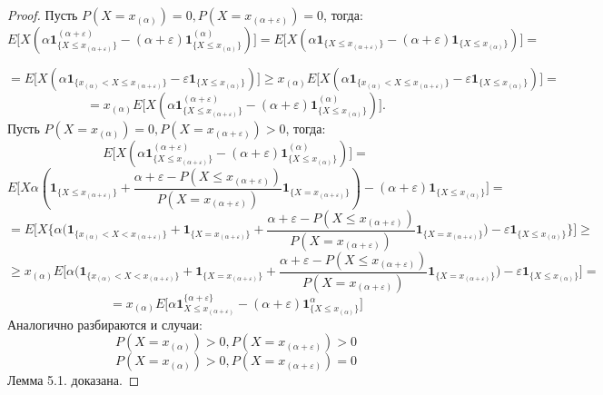 \documentclass[18pt,a4paper]{article}
\theoremstyle{plain}
\theoremstyle{definition}
\begin{document}
\begin{proof}
Пусть $P(X=x_{(\alpha)})=0,P(X=x_{(\alpha + \varepsilon)})=0 $, тогда:\\
$$
E\Big[X(\alpha\mathbf{1}^{(\alpha + \varepsilon)}_{\{X \le x_{(\alpha + \varepsilon)}  \} } - (\alpha + \varepsilon)\mathbf{1}^{(\alpha)}_{\{X \le x_{(\alpha)}  \} } )\Big]
= E\Big[X(\alpha\mathbf{1}_{\{X \le x_{(\alpha + \varepsilon)}  \} } - (\alpha + \varepsilon)\mathbf{1}_{\{X \le x_{(\alpha)}  \} } )\Big] =
$$

$$
= E\Big[X(\alpha\mathbf{1}_{\{x_{(\alpha)} < X \le x_{(\alpha + \varepsilon)}  \} } - \varepsilon\mathbf{1}_{\{X \le x_{(\alpha)}  \} } )\Big] \ge
x_{(\alpha)}E\Big[X(\alpha\mathbf{1}_{\{x_{(\alpha)} < X \le x_{(\alpha + \varepsilon)}  \} } - \varepsilon\mathbf{1}_{\{X \le x_{(\alpha)}  \} } )\Big] =
$$
$$
= x_{(\alpha)}E\Big[X(\alpha\mathbf{1}^{(\alpha+\varepsilon)}_{\{ X \le x_{(\alpha + \varepsilon)}  \} } - (\alpha+\varepsilon)\mathbf{1}^{(\alpha)}_{\{X \le x_{(\alpha)}  \} } )\Big].
$$
Пусть $P(X=x_{(\alpha)})=0,P(X=x_{(\alpha + \varepsilon)})>0 $, тогда:\\
$$
E\Big[X(\alpha\mathbf{1}^{(\alpha + \varepsilon)}_{\{X \le x_{(\alpha + \varepsilon)}  \} } - (\alpha + \varepsilon)\mathbf{1}^{(\alpha)}_{\{X \le x_{(\alpha)}  \} } )\Big]
=
$$
$$
E\Big[X\alpha(\mathbf{1}_{\{X \le x_{(\alpha + \varepsilon)}  \} }+
\frac{\alpha+\varepsilon - P(X \le x_{(\alpha+\varepsilon)})}{P(X = x_{(\alpha+\varepsilon)})}\mathbf{1}_{\{X=x_{(\alpha+\varepsilon)}\}}) - (\alpha + \varepsilon)\mathbf{1}_{\{X \le x_{(\alpha)}  \} } \Big]=
$$
$$
= E\Big[X\Big\{\alpha\big(\mathbf{1}_{\{x_{(\alpha)} < X < x_{(\alpha + \varepsilon)}  \} }+ \mathbf{1}_{ \{ X = x_{(\alpha + \varepsilon)}  \} } +
\frac{\alpha+\varepsilon - P(X \le x_{(\alpha+\varepsilon)})}{P(X = x_{(\alpha+\varepsilon)})}\mathbf{1}_{\{X=x_{(\alpha+\varepsilon)}\}}\big) - \varepsilon\mathbf{1}_{\{X \le x_{(\alpha)}  \}}\Big\}\Big] \ge
$$
$$
\ge x_{(\alpha)} E\Big[\alpha\big(\mathbf{1}_{\{x_{(\alpha)} < X < x_{(\alpha + \varepsilon)}  \} }+ \mathbf{1}_{ \{ X = x_{(\alpha + \varepsilon)}  \} } +
\frac{\alpha+\varepsilon - P(X \le x_{(\alpha+\varepsilon)})}{P(X = x_{(\alpha+\varepsilon)})}\mathbf{1}_{\{X=x_{(\alpha+\varepsilon)}\}}\big) - \varepsilon\mathbf{1}_{\{X \le x_{(\alpha)}  \}}\Big] =
$$
$$
= x_{(\alpha)} E\Big[ \alpha\mathbf{1}^{\{\alpha+\varepsilon\}}_{X \le x_{(\alpha+\varepsilon)}} - (\alpha+\varepsilon)\mathbf{1}^{\alpha}_{\{X \le x_{(\alpha)}\}}    \Big]
$$
Аналогично разбираются и случаи:\\
$$
P(X=x_{(\alpha)})>0,P(X=x_{(\alpha + \varepsilon)})>0
$$
$$
P(X=x_{(\alpha)})>0,P(X=x_{(\alpha + \varepsilon)})=0
$$
Лемма 5.1. доказана.

\end{proof}
\end{document}
